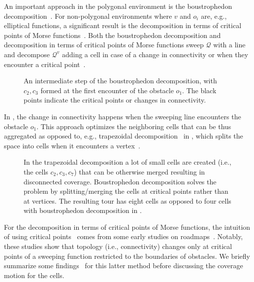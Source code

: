 An important approach in the polygonal environment is the boustrophedon decomposition~\citep{choset2000coverage}. For non-polygonal environments where $v$ and $o_i$ are, e.g., elliptical functions, a significant result is the decomposition in terms of critical points of Morse functions~\citep{choset2000exact}. Both the boustrophedon decomposition and decomposition in terms of critical points of Morse functions sweep $\mathcal{Q}$ with a line and decompose $\mathcal{Q}^v$ adding a cell in case of a change in connectivity or when they encounter a critical point~\citep{choset2000coverage,choset2001coverage,choset2005principles}. 
\begin{figure}[h]
  \centering
  \selectfont
  
  \caption[Intermediate step of the boustrophedon decomposition]{An intermediate step of the boustrophedon decomposition, with $c_2,c_3$ formed at the first encounter of the obstacle $o_1$. The black points indicate the critical points or changes in connectivity.
  }
  \label{fig:bcd3}
\end{figure}
In , the change in connectivity happens when the sweeping line encounters the obstacle $o_1$. This approach optimizes the neighboring cells that can be thus aggregated as opposed to, e.g., trapezoidal decomposition~\citep{galceran2013survey} in , which splits the space into cells when it encounters a vertex~\citep{lavalle2006planning}.
\begin{figure}[h]
  \centering
  \selectfont
  
  \caption[Trapezoidal decomposition]{In the trapezoidal decomposition a lot of small cells are created (i.e., the cells $c_2,c_3,c_7$) that can be otherwise merged resulting in disconnected coverage. Boustrophedon decomposition solves the problem by splitting/merging the cells at critical points rather than at vertices. The resulting tour has eight cells as opposed to four cells with boustrophedon decomposition in .}
  \label{fig:trap}
\end{figure}
For the decomposition in terms of critical points of Morse functions, the intuition of using critical points~\citep{choset2000exact} comes from some early studies on roadmaps~\citep{canny1988complexity,canny1988constructing,canny1993opportunistic}. Notably, these studies show that topology (i.e., connectivity) changes only at critical points of a sweeping function restricted to the boundaries of obstacles. We briefly summarize some findings~\citep{choset2000exact} for this latter method before discussing the coverage motion for the cells.

